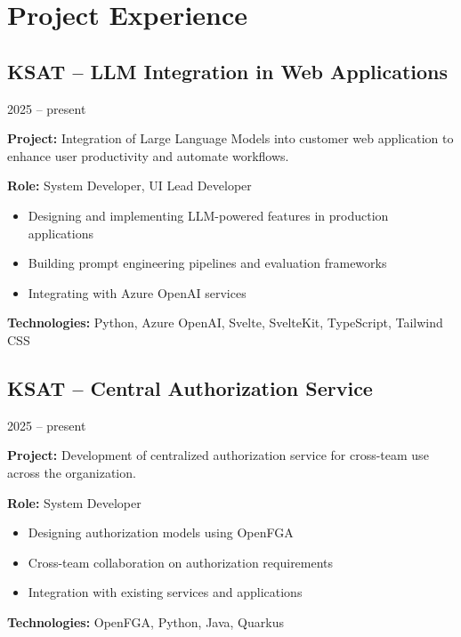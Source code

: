 \documentclass[10pt, a4paper]{article}
\begin{document}
\section*{Project Experience}

\subsection*{KSAT -- LLM Integration in Web Applications}
{\small\color{lightgray}2025 -- present}

{\small
\textbf{Project:} Integration of Large Language Models into customer web application to enhance user productivity and automate workflows.

\textbf{Role:} System Developer, UI Lead Developer

\begin{itemize}[noitemsep, leftmargin=1.2em, topsep=0.2em]
    \item Designing and implementing LLM-powered features in production applications
    \item Building prompt engineering pipelines and evaluation frameworks
    \item Integrating with Azure OpenAI services
\end{itemize}

\textbf{Technologies:} Python, Azure OpenAI, Svelte, SvelteKit, TypeScript, Tailwind CSS
}

\vspace{0.8em}
\subsection*{KSAT -- Central Authorization Service}
{\small\color{lightgray}2025 -- present}

{\small
\textbf{Project:} Development of centralized authorization service for cross-team use across the organization.

\textbf{Role:} System Developer

\begin{itemize}[noitemsep, leftmargin=1.2em, topsep=0.2em]
    \item Designing authorization models using OpenFGA
    \item Cross-team collaboration on authorization requirements
    \item Integration with existing services and applications
\end{itemize}

\textbf{Technologies:} OpenFGA, Python, Java, Quarkus
}
\end{document}
